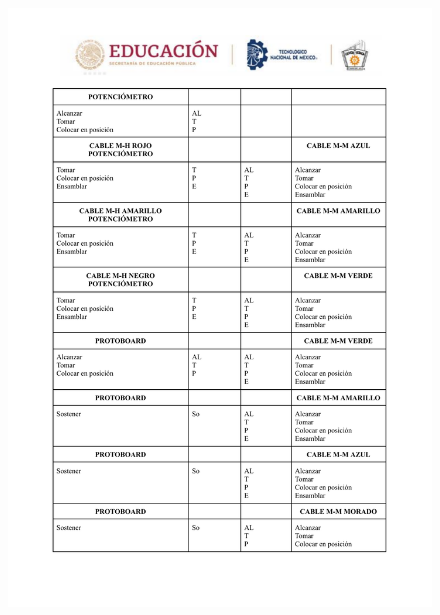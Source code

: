     \begin{figure}
        \centering
        \includegraphics[trim = {5mm 15mm 5mm 10mm},clip,scale=0.3]{24/Img/diagramaBimanual2.pdf}
        \caption{}
        \label{fig:Diagrama Bimanual2}
    \end{figure}
